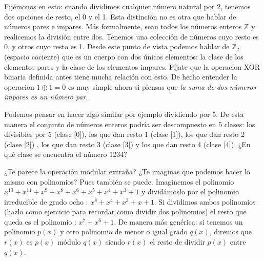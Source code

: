 Fijémonos en esto: cuando dividimos cualquier número natural por 2, tenemos dos opciones de resto, el 0 y el 1. Esta distinción no es otra que hablar de números pares e impares. Más formalmente, sean  todos los números enteros $\mathbb{Z}$ y realicemos la división entre dos. Tenemos una colección de números cuyo resto es 0, y otros cuyo resto es 1. Desde este punto de vista podemos hablar de $\mathbb{Z}_2$ (espacio cociente) que es un cuerpo con dos únicos elementos: la clase de los elementos pares y la clase de los elementos impares. Fíjate que la operacion XOR binaria definida antes tiene mucha relación con esto. De hecho entender la operacion $1 \oplus 1= 0$ es muy simple ahora si piensas que {\sl la suma de dos números impares es un número par}.

Podemos pensar en hacer algo similar por ejemplo dividiendo por 5. De esta manera el conjunto de números enteros podría ser descompuesto en 5 clases: los divisibles por 5 (clase [0]), los que dan resto 1 (clase [1]), los que dan resto 2 (clase [2]) , los que dan resto 3 (clase [3]) y los que dan resto 4 (clase [4]). ¿En qué clase se encuentra el número 1234?

¿Te parece la operación modular extraña? ¿Te imaginas que podemos hacer lo mismo con polinomios? Pues también se puede. Imaginemos el polinomio \mbox{$x^{13}+ x^{11}+x^9+x^8+ x^6+x^5+x^4+x^3+1$} y dividámoslo por el polinomio irreducible de grado ocho : \mbox{$x^8+x^4+x^3+x+1$}. Si dividimos ambos polinomios (hazlo como ejercicio para recordar como dividir dos polinomios) el resto que queda es el polinomio : \mbox{$x^7+x^6+1$}. De manera más genérica: si tenemos un polinomio $p(x)$ y otro polinomio de menor o igual grado $q(x)$, diremos que $r(x)$ es $p(x)$ módulo $q(x)$ siendo $r(x)$ el resto de dividir $p(x)$ entre $q(x)$.

